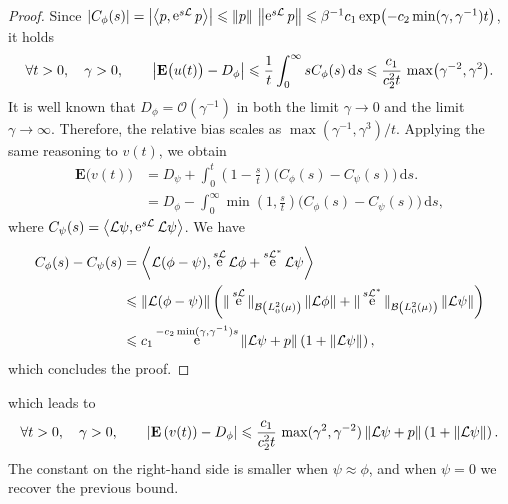 \documentclass[11pt,a4paper]{article}
\DeclareMathOperator{\e}{e}
\newcommand{\expect}[0]{\mathbf{E}}
\renewcommand{\d}{\mathrm d}
\theoremstyle{plain}
\numberwithin{equation}{section}
\renewcommand{\leq}{\leqslant}
\begin{document}
\begin{proof}
Since $\abs{C_{\phi}(s)} = \abs{\ip{p}{\e^{s \mathcal L} p}} \leq \norm{p} \, \norm{\e^{s \mathcal L} p} \leq \beta^{-1} c_1 \exp\bigl( - c_2 \min(\gamma, \gamma^{-1}) t\bigr)$, it holds
\[
    \forall t > 0, \quad \gamma > 0, \qquad
    \abs{\expect\bigl(u(t)\bigr) - D_{\phi}}
    \leq \frac{1}{t}\int_{0}^{\infty} s C_{\phi}(s) \, \d s
    \leq \frac{c_1}{c_2^2 t} \, \max\bigl(\gamma^{-2}, \gamma^2\bigr).
\]
It is well known that $D_{\phi} = \mathcal O(\gamma^{-1})$ in both the limit $\gamma \to 0$ and the limit $\gamma \to \infty$.
Therefore, the relative bias scales as $\max(\gamma^{-1}, \gamma^3) / t$.
Applying the same reasoning to $v(t)$, we obtain
\begin{align*}
    \expect \bigl(v(t)\bigr)
    &= D_{\psi} + \int_{0}^{t} \left(1 - \frac{s}{t}\right) \bigl( C_{\phi}(s) - C_{\psi}(s) \bigr) \, \d s. \\
    &= D_{\phi} - \int_{0}^{\infty} \min\left(1, \frac{s}{t}\right) \bigl( C_{\phi}(s) - C_{\psi}(s) \bigr) \, \d s,
\end{align*}
where $C_{\psi}(s) = \ip{\mathcal L \psi}{\e^{s \mathcal L} \mathcal L \psi}$.
We have
\begin{align*}
    C_{\phi}(s) - C_{\psi}(s)
    &= \ip{\mathcal L (\phi - \psi)}{\e^{s \mathcal L} \mathcal L \phi + \e^{s \mathcal L^*} \mathcal  L\psi} \\
    &\leq \norm{\mathcal L(\phi - \psi)}
    \left( \norm*{\e^{s \mathcal L}}[\mathcal B\left(L^2_0(\mu) \right)] \norm{\mathcal L \phi} + \norm*{\e^{s \mathcal L^*}}[\mathcal B\left(L^2_0(\mu) \right)] \norm{\mathcal L \psi} \right) \\
    &\leq c_1 \e^{-c_2 \min(\gamma, \gamma^{-1}) s} \norm{\mathcal L\psi + p}  \left(1 + \norm{\mathcal L \psi} \right),
\end{align*}
which concludes the proof.
\end{proof}



which leads to
\begin{align*}
    \forall t > 0, \quad \gamma > 0, \qquad
    \abs{\expect \left( v(t) \right) - D_{\phi}}
    \leq \frac{c_1}{c_2^2 t} \, \max(\gamma^2, \gamma^{-2}) \norm{\mathcal L\psi + p}  \left(1 + \norm{\mathcal L \psi} \right).
\end{align*}
The constant on the right-hand side is smaller when $\psi \approx \phi$,
and when $\psi = 0$ we recover the previous bound.
\end{document}
